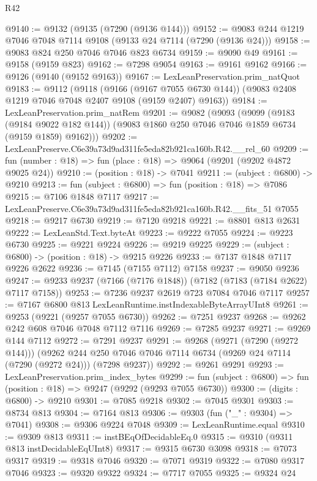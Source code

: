 \begin{lexlean}{R42}
\begin{coremodule}
{@9140 := @9132 (@9135 (@7290 (@9136 @144)))
@9152 := @9083 @244 @1219 @7046 @7048 @7114 @9108 (@9133 @24 @7114 (@7290 (@9136 @24)))
@9158 := @9083 @824 @250 @7046 @7046 @823 @6734
@9159 := @9090 @49
@9161 := @9158 (@9159 @823)
@9162 := @7298 @9054
@9163 := @9161 @9162
@9166 := @9126 (@9140 (@9152 @9163))
@9167 := LexLeanPreservation.prim_natQuot
@9183 := @9112
    (@9118
      (@9166 (@9167 @7055 @6730 @144))
      (@9083 @2408 @1219 @7046 @7048 @2407 @9108 (@9159 @2407) @9163))
@9184 := LexLeanPreservation.prim_natRem
@9201 := @9082
    (@9093
      (@9099
        (@9183 (@9184 @9022 @182 @144))
        (@9083 @1860 @250 @7046 @7046 @1859 @6734 (@9159 @1859) @9162)))
@9202 := LexLeanPreserve.C6e39a73d9ad311fe5eda82b921ca160b.R42.__rel_60
@9209 := fun (number : @18) => fun (place : @18) => @9064 (@9201 (@9202 @4872 @9025 @24))
@9210 := (position : @18) -> @7041
@9211 := (subject : @6800) -> @9210
@9213 := fun (subject : @6800) => fun (position : @18) => @7086
@9215 := @7106 @1848 @7117
@9217 := LexLeanPreserve.C6e39a73d9ad311fe5eda82b921ca160b.R42.__fits_51 @7055
@9218 := @9217 @6730
@9219 := @7120 @9218
@9221 := @8801 @813 @2631
@9222 := LexLeanStd.Text.byteAt
@9223 := @9222 @7055
@9224 := @9223 @6730
@9225 := @9221 @9224
@9226 := @9219 @9225
@9229 := (subject : @6800) -> (position : @18) -> @9215 @9226
@9233 := @7137 @1848 @7117 @9226 @2622
@9236 := @7145 (@7155 @7112) @7158
@9237 := @9050 @9236
@9247 := @9233 @9237 (@7166 (@7176 @1848)) (@7182 (@7183 (@7184 @2622) @7117 @7158))
@9253 := @7236 @9237 @2619 @723 @7084 @7046 @7117
@9257 := @7167 @6800 @813 LexLeanRuntime.instIndexableByteArrayUInt8
@9261 := @9253 (@9221 (@9257 @7055 @6730))
@9262 := @7251 @9237
@9268 := @9262 @242 @608 @7046 @7048 @7112 @7116
@9269 := @7285 @9237
@9271 := @9269 @144 @7112
@9272 := @7291 @9237
@9291 := @9268
    (@9271 (@7290 (@9272 @144)))
    (@9262 @244 @250 @7046 @7046 @7114 @6734 (@9269 @24 @7114 (@7290 (@9272 @24))) (@7298 @9237))
@9292 := @9261 @9291
@9293 := LexLeanPreservation.prim_index_bytes
@9299 := fun (subject : @6800) => fun (position : @18) => @9247 (@9292 (@9293 @7055 @6730))
@9300 := (digits : @6800) -> @9210
@9301 := @7085 @9218
@9302 := @7045 @9301
@9303 := @8734 @813
@9304 := @7164 @813
@9306 := @9303 (fun ("_" : @9304) => @7041)
@9308 := @9306 @9224 @7048
@9309 := LexLeanRuntime.equal
@9310 := @9309 @813
@9311 := instBEqOfDecidableEq.{0}
@9315 := @9310 (@9311 @813 instDecidableEqUInt8)
@9317 := @9315 @6730 @3098
@9318 := @7073 @9317
@9319 := @9318 @7046
@9320 := @7071 @9319
@9322 := @7080 @9317 @7046
@9323 := @9320 @9322
@9324 := @7717 @7055
@9325 := @9324 @24
}
\end{coremodule}
\end{lexlean}
